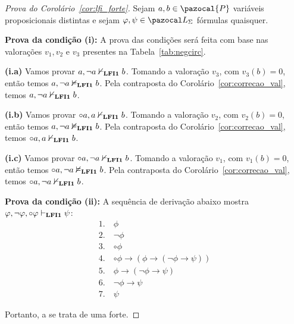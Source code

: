     \begin{proof}[Prova do Corolário~\ref{cor:lfi_forte}]
        Sejam $a, b \in \pazocal{P}$ variáveis proposicionais distintas e sejam $\phi, \psi \in \ling{}$ fórmulas quaisquer.

        \begin{adjustwidth}{1cm}{}

            \noindent\textbf{Prova da condição (i):} A prova das condições será feita com base nas valorações $v_1, v_2$ e $v_3$ presentes na Tabela~\ref{tab:negcirc}.
    
            \begin{adjustwidth}{1cm}{}

                \textbf{(i.a)} Vamos provar $a, \neg a \nvdash_{{\normalfont\textbf{LFI1}}{}} b$. Tomando a valoração $v_3$, com $v_3(b) = 0$, então temos $a, \neg a \nvDash_{{\normalfont\textbf{LFI1}}{}} b$. Pela contraposta do Corolário~\ref{cor:correcao_val}, temos  $a, \neg a \nvdash_{{\normalfont\textbf{LFI1}}{}} b$.

                \noindent\textbf{(i.b)} Vamos provar $\circ a, a \nvdash_{{\normalfont\textbf{LFI1}}{}} b$. Tomando a valoração $v_2$, com $v_2(b) = 0$, então temos $a, \neg a \nvDash_{{\normalfont\textbf{LFI1}}{}} b$. Pela contraposta do Corolário~\ref{cor:correcao_val}, temos $\circ a, a \nvdash_{{\normalfont\textbf{LFI1}}{}} b$.

                \noindent\textbf{(i.c)} Vamos provar $\circ a, \neg a \nvdash_{{\normalfont\textbf{LFI1}}{}} b$. Tomando a valoração $v_1$, com $v_1(b) = 0$, então temos $\circ a, \neg a \nvDash_{{\normalfont\textbf{LFI1}}{}} b$. Pela contraposta do Corolário~\ref{cor:correcao_val}, temos $\circ a, \neg a \nvdash_{{\normalfont\textbf{LFI1}}{}} b$.
            \end{adjustwidth}
    
            \noindent\textbf{Prova da condição (ii):} A sequência de derivação abaixo mostra $\varphi, \neg \varphi, \circ \varphi \vdash_{{\normalfont\textbf{LFI1}}{}} \psi$:
            \begin{align*}
                1.~ & \phi \tag{Premissa}       \\
                2.~ & \neg \phi \tag{Premissa}  \\
                3.~ & \circ \phi \tag{Premissa} \\
                4.~ & \circ \phi \to (\phi \to (\neg \phi \to \psi)) \tag{bc1} \\
                5.~ & \phi \to (\neg \phi \to \psi) \tag{MP 3, 4} \\
                6.~ & \neg \phi \to \psi \tag{MP 1, 5} \\
                7.~ & \psi \tag{MP 2, 6}
            \end{align*}

        \end{adjustwidth}


        Portanto, a \lfium{} se trata de uma \lfi{} forte.
    \end{proof}


